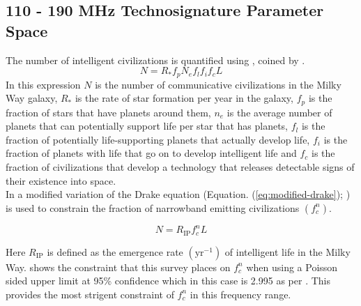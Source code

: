 \subsection{110 - 190 MHz Technosignature Parameter Space}
 The number of intelligent civilizations is quantified using , coined by \cite{Drake:1961bv}. 
\begin{equation}
    N = R_* f_p N_e f_l f_i f_c L 
    \label{eq:Drake_equation}
\end{equation}
 In this expression $N$ is the number of communicative civilizations in the Milky Way galaxy, $R_{*}$ is the rate of star formation per year in the galaxy, $f_{p}$ is the fraction of stars that have planets around them, $n_{e}$ is the average number of planets that can potentially support life per star that has planets, $f_{l}$ is the fraction of potentially life-supporting planets that actually develop life, $f_{i}$ is the fraction of planets with life that go on to develop intelligent life and $f_{c}$ is the fraction of civilizations that develop a technology that releases detectable signs of their existence into space. \\ 

In \cite{2022VishalPulsed} a modified variation of the Drake equation (Equation. (\ref{eq:modified-drake}); \citealt{Sagan1966}) is used to constrain the fraction of narrowband emitting civilizations $(f_c^n)$.  

\begin{equation}
    N =  R_{\text{IP}}f^n_cL
    \label{eq:modified-drake}
\end{equation}

Here  $R_{\text{IP}}$ is defined as the emergence rate $(\text{yr}^{-1})$ of intelligent life in the Milky Way.   shows the constraint that this survey places on $f_c^n$ when using a Poisson sided upper limit at 95\% confidence which in this case is 2.995 as per \cite{1986_Poission_tables}. This provides the most strigent constraint of $f^n_c$ in this frequency range.

